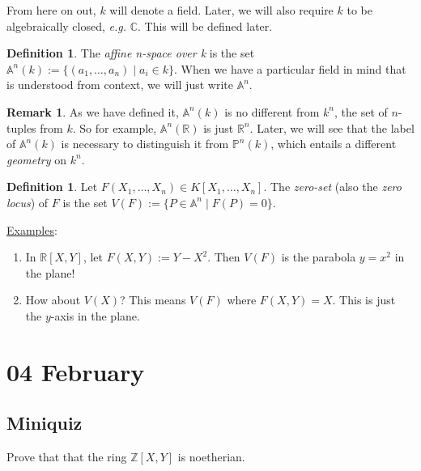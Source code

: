 \documentclass[12pt]{article}
\newcommand{\z}{\mathbb{Z}}
\newcommand{\cx}{\mathbb{C}}
\newcommand{\real}{\mathbb{R}}
\newcommand{\ita}[1]{\textit{#1}}
\theoremstyle{definition}
\newtheorem{definition}[theorem]{Definition}
\newtheorem*{remark}{Remark}
\begin{document}
From here on out, $k$ will denote a field. Later, we will also require $k$ to be algebraically closed, \ita{e.g.} $\cx$. This will be defined later.
\begin{definition}
    The \ita{affine n-space over k} is the set $\mathbb{A}^n(k):=\{(a_1,\dotsc,a_n)\mid a_i\in k\}$. When we have a particular field in mind that is understood from context, we will just write $\mathbb{A}^n$.
\end{definition}
\begin{remark}
    As we have defined it, $\mathbb{A}^n(k)$ is no different from $k^n$, the set of $n$-tuples from $k$. So for example, $\mathbb{A}^n(\real)$ is just $\real^n$. Later, we will see that the label of $\mathbb{A}^n(k)$ is necessary to distinguish it from $\mathbb{P}^n(k)$, which entails a different \ita{geometry} on $k^n$.
\end{remark}
\begin{definition}
    Let $F(X_1,\dotsc,X_n)\in K[X_1,\dotsc,X_n]$. The \ita{zero-set} (also the \ita{zero locus}) of $F$ is the set $V(F):=\{P\in\mathbb{A}^n\mid F(P)=0\}$.
\end{definition}
\underline{Examples}:
\begin{enumerate}
    \item In $\real[X,Y]$, let $F(X,Y):=Y-X^2$. Then $V(F)$ is the parabola $y=x^2$ in the plane!
    \item How about $V(X)$? This means $V(F)$ where $F(X,Y)=X$. This is just the $y$-axis in the plane.
\end{enumerate}
\section{04 February}
\subsection{Miniquiz}
Prove that that the ring $\z[X,Y]$ is noetherian.
\end{document}
